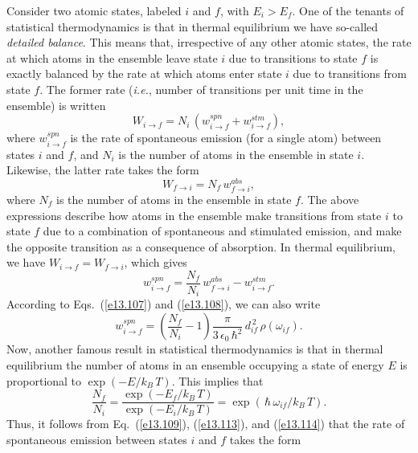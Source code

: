 Consider two atomic states, labeled $i$ and $f$, with $E_i> E_f$. One
of the tenants of statistical thermodynamics is that in thermal equilibrium
we have so-called {\em detailed balance}. This means that, irrespective
of any other atomic states, the rate at which atoms in the ensemble leave
state $i$ due to  transitions to state $f$ is exactly balanced by the
rate at which atoms enter state $i$ due to transitions from state $f$.
The former rate ({\em i.e.}, number of transitions per unit time in the ensemble) is written
\begin{equation}
W_{i\rightarrow f} = N_i\,(w_{i\rightarrow f}^{spn} + w_{i\rightarrow f}^{stm}),
\end{equation}
where $w_{i\rightarrow f}^{spn}$ is the rate of spontaneous emission
(for a single atom) between
states $i$ and $f$, and $N_i$ is the number of atoms in the ensemble
in state $i$. Likewise, the latter rate takes the form
\begin{equation}
W_{f\rightarrow i} = N_f\,w^{abs}_{f\rightarrow i},
\end{equation}
where $N_f$ is the number of atoms in the ensemble in state $f$.
The above expressions describe how atoms in the ensemble make transitions from
state $i$ to state $f$ due to a combination of spontaneous and stimulated emission, and make the opposite transition as a consequence  of absorption.
In thermal equilibrium, we have $W_{i\rightarrow f}=W_{f\rightarrow i}$,
which gives
\begin{equation}
w_{i\rightarrow f}^{spn} = \frac{N_f}{N_i}\,w^{abs}_{f\rightarrow i}-
w_{i\rightarrow f}^{stm}.
\end{equation}
According to Eqs.~(\ref{e13.107}) and (\ref{e13.108}), we can also write
\begin{equation}\label{e13.113}
w_{i\rightarrow f}^{spn} = \left(\frac{N_f}{N_i}-1\right)\frac{\pi}{3\,\epsilon_0\,\hbar^2}\,d^{\,2}_{if}\,\rho(\omega_{if}).
\end{equation}
Now, another famous result in statistical thermodynamics is that
in thermal equilibrium the number of atoms in an ensemble occupying
a state of energy $E$ is proportional to $\exp(-E/k_B\,T)$. This implies
that
\begin{equation}\label{e13.114}
\frac{N_f}{N_i} = \frac{\exp(-E_f/k_B\,T)}{\exp(-E_i/k_B\,T)}
= \exp(\,\hbar\, \omega_{if}/k_B\,T).
\end{equation}
Thus, it follows from Eq.~(\ref{e13.109}), (\ref{e13.113}), and (\ref{e13.114}) that the rate of spontaneous emission between states
$i$ and $f$ takes the form
